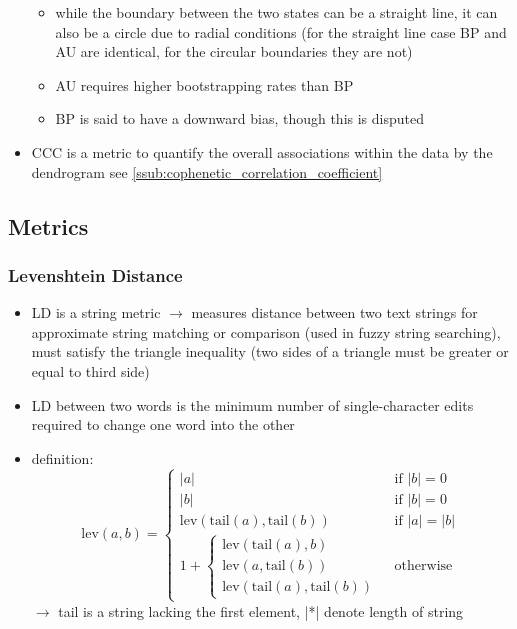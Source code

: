 \documentclass[12pt,a4paper]{article}
\begin{document}
\begin{itemize}
\begin{itemize}
    \item while the boundary between the two states can be a straight line, it can also be a circle due to radial conditions (for the straight line case BP and AU are identical, for the circular boundaries they are not)
    \item AU requires higher bootstrapping rates than BP
    \item BP is said to have a downward bias, though this is disputed
  \end{itemize}
  \item CCC is a metric to quantify the overall associations within the data by the dendrogram see \ref{ssub:cophenetic_correlation_coefficient}
\end{itemize}





\subsection{Metrics} %
\label{sub:metrics}

\subsubsection{Levenshtein Distance} %
\label{ssub:levenshtein_distance}
  \begin{itemize}
    \item LD is a string metric 
    \newline \indent $\longrightarrow$ measures distance between two text strings for approximate string matching or comparison (used in fuzzy string searching), must satisfy the triangle inequality (two sides of a triangle must be greater or equal to third side)
    \item LD between two words is the minimum number of single-character edits required to change one word into the other
    \item definition:
    \begin{equation}
      \text{lev}(a, b) = \begin{cases}
        |a| & \text{ if } |b| = 0 \\
        |b| & \text{ if } |b| = 0 \\
        \text{lev} (\text{tail}(a), \text{tail}(b)) & \text{ if } |a| = |b| \\
        1 + \begin{cases}
          \text{lev} (\text{tail}(a), b) \\
          \text{lev} (a, \text{tail}(b)) \\
          \text{lev} (\text{tail}(a), \text{tail}(b))
          
        \end{cases} & \text{ otherwise }
      \end{cases}
    \end{equation}
      \newline \indent $\longrightarrow$ tail is a string lacking the first element, |*| denote length of string
  \end{itemize}
\end{document}
